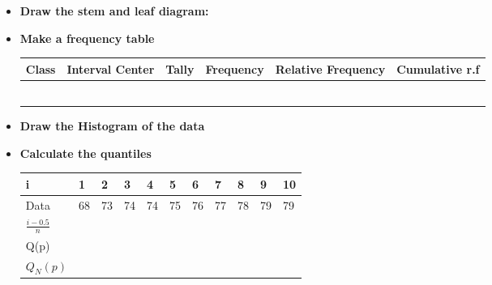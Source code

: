 \documentclass[11pt]{article}\usepackage[]{graphicx}\usepackage[]{color}
\begin{document}
\begin{itemize}
		
		\item \textbf{Draw the stem and leaf diagram:} \\
\vspace{2 in}
		\item \textbf{ Make a frequency table }			
\begin{center}
	\begin{tabular}{p{2cm}| p{2cm}|p{3cm}|p{2cm}|p{2cm}|p{2cm}}
		Class & Interval Center& Tally & Frequency & Relative Frequency & Cumulative r.f \\
		\hline
		& & & & & \vspace{0.3cm}  \\
		  
		\hline      
		& & & & &\vspace{0.3cm} \\        
		\hline
		& & & &  &\vspace{0.3cm}\\         
		\hline
		& & & & &\vspace{0.3cm} \\         
		\hline
		& & & & &\vspace{0.3cm} \\ 
				\hline
		& & & & &\vspace{0.3cm} \\ 
	\end{tabular}
\end{center}

		\item \textbf{Draw the Histogram of the data}
		\pagebreak
		
		\item \textbf{Calculate the quantiles }
\begin{center}
	\begin{tabular}{p{1cm} p{1cm}p{1cm}p{1cm}p{1cm}p{1cm} p{1cm}p{1cm}p{1cm}p{1cm}p{1cm}}
		i &1 & 2 &  3&  4& 5 & 6  &7  &8 &9 &10  \\
		\hline
		Data& 68 &73& 74& 74& 75& 76& 77& 78& 79& 79\\
		\hline
		\vspace{.15cm}
		$\frac{i- 0.5}{n}$\vspace{.15cm}\\
		\hline
		\vspace{.15cm}
		Q(p)\vspace{.15cm}\\
		\hline
				\vspace{.15cm}
		$Q_N(p)$\vspace{.15cm}\\
		\hline
		

\end{tabular}
\end{center}
\end{itemize}
\end{document}
